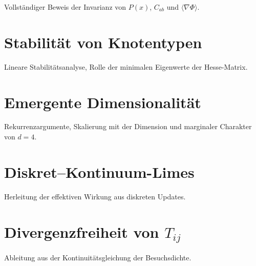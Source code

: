 \documentclass[11pt,a4paper]{article}
\begin{document}
Vollständiger Beweis der Invarianz von $P(x)$, $C_{ab}$ und $\langle \nabla \Phi \rangle$.

\section{Stabilit\"at von Knotentypen}

Lineare Stabilitätsanalyse, Rolle der minimalen Eigenwerte der Hesse-Matrix.

\section{Emergente Dimensionalit\"at}

Rekurrenzargumente, Skalierung mit der Dimension und marginaler Charakter von $d=4$.

\section{Diskret--Kontinuum-Limes}

Herleitung der effektiven Wirkung aus diskreten Updates.

\section{Divergenzfreiheit von $T_{ij}$}

Ableitung aus der Kontinuitätsgleichung der Besuchsdichte.



\end{document}
